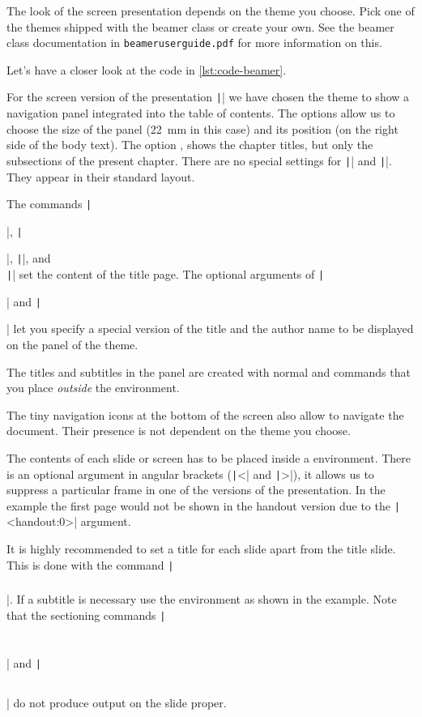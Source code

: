 The look of the screen presentation depends on the theme you choose. Pick one of the themes shipped with the beamer class or
create your own. See the beamer class documentation in
\texttt{beameruserguide.pdf} for more information on this.

Let's have a closer look at the code in \autoref{lst:code-beamer}.

For the screen version of the presentation \texttt|| we
have chosen the  theme to show a navigation panel
integrated into the table of contents. The options allow us to choose the
size of the panel (22~mm in this case) and its position (on the right
side of the body text). The option , shows
the chapter titles, but only the subsections of the present
chapter. There are no special settings for \texttt|| and
\texttt||. They appear in their standard layout.

The commands \texttt|\title{}|, \texttt|\author{}|, \texttt|\institute{}|,
and\\ \texttt|\titlegraphic{}| set the content of the title page. The
optional arguments of \texttt|\title[]{}| and \texttt|\author[]{}|
let you specify a special version of the title and the author
name to be displayed on the panel of the  theme.

The titles and subtitles in the panel are created with normal
 and  commands that you place
\emph{outside} the  environment.

The tiny navigation icons at the bottom of the screen also allow to
navigate the document. Their presence is not dependent on the theme
you choose.

The contents of each slide or screen has to be placed inside a
 environment. There is an optional argument in angular
brackets (\texttt|<| and \texttt|>|), it allows us to suppress a particular
frame in one of the versions of the presentation. In the example the
first page would not be shown in the handout version due to the
\texttt|<handout:0>| argument.

It is highly recommended to set a title for each slide apart from the
title slide. This is done with the command \texttt|\frametitle{}|. If a
subtitle is necessary use the  environment as shown
in the example. Note that the sectioning commands \texttt|\section{}|
and \texttt|\subsection{}| do not produce output on the slide proper.

